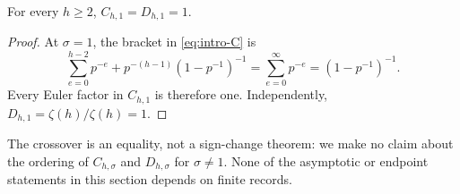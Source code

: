 \begin{corollary}
\label{cor:crossover}
For every $h\ge2$, $C_{h,1}=D_{h,1}=1$.
\end{corollary}

\begin{proof}
At $\sigma=1$, the bracket in \cref{eq:intro-C} is
\[
  \sum_{e=0}^{h-2}p^{-e}
  +p^{-(h-1)}(1-p^{-1})^{-1}
  =\sum_{e=0}^{\infty}p^{-e}=(1-p^{-1})^{-1}.
\]
Every Euler factor in $C_{h,1}$ is therefore one.  Independently,
$D_{h,1}=\zeta(h)/\zeta(h)=1$.
\end{proof}

The crossover is an equality, not a sign-change theorem: we make no claim
about the ordering of $C_{h,\sigma}$ and $D_{h,\sigma}$ for
$\sigma\ne1$.  None of the asymptotic or endpoint statements in this
section depends on finite records.
